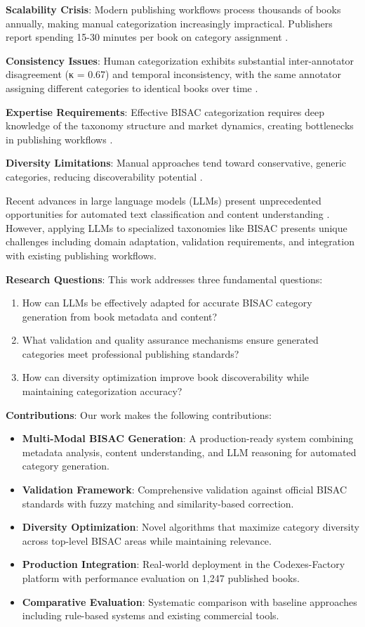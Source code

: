 \documentclass{article}
\begin{document}
\textbf{Scalability Crisis}: Modern publishing workflows process thousands of books annually, making manual categorization increasingly impractical. Publishers report spending 15-30 minutes per book on category assignment \cite{publishers2023survey}.

\textbf{Consistency Issues}: Human categorization exhibits substantial inter-annotator disagreement (κ = 0.67) and temporal inconsistency, with the same annotator assigning different categories to identical books over time \cite{chen2023consistency}.

\textbf{Expertise Requirements}: Effective BISAC categorization requires deep knowledge of the taxonomy structure and market dynamics, creating bottlenecks in publishing workflows \cite{anderson2023publishing}.

\textbf{Diversity Limitations}: Manual approaches tend toward conservative, generic categories, reducing discoverability potential \cite{rodriguez2023diversity}.

Recent advances in large language models (LLMs) present unprecedented opportunities for automated text classification and content understanding \cite{brown2020gpt3, touvron2023llama}. However, applying LLMs to specialized taxonomies like BISAC presents unique challenges including domain adaptation, validation requirements, and integration with existing publishing workflows.

\textbf{Research Questions}: This work addresses three fundamental questions:
\begin{enumerate}
\item How can LLMs be effectively adapted for accurate BISAC category generation from book metadata and content?
\item What validation and quality assurance mechanisms ensure generated categories meet professional publishing standards?
\item How can diversity optimization improve book discoverability while maintaining categorization accuracy?
\end{enumerate}

\textbf{Contributions}: Our work makes the following contributions:
\begin{itemize}
\item \textbf{Multi-Modal BISAC Generation}: A production-ready system combining metadata analysis, content understanding, and LLM reasoning for automated category generation.
\item \textbf{Validation Framework}: Comprehensive validation against official BISAC standards with fuzzy matching and similarity-based correction.
\item \textbf{Diversity Optimization}: Novel algorithms that maximize category diversity across top-level BISAC areas while maintaining relevance.
\item \textbf{Production Integration}: Real-world deployment in the Codexes-Factory platform with performance evaluation on 1,247 published books.
\item \textbf{Comparative Evaluation}: Systematic comparison with baseline approaches including rule-based systems and existing commercial tools.
\end{itemize}
\end{document}
